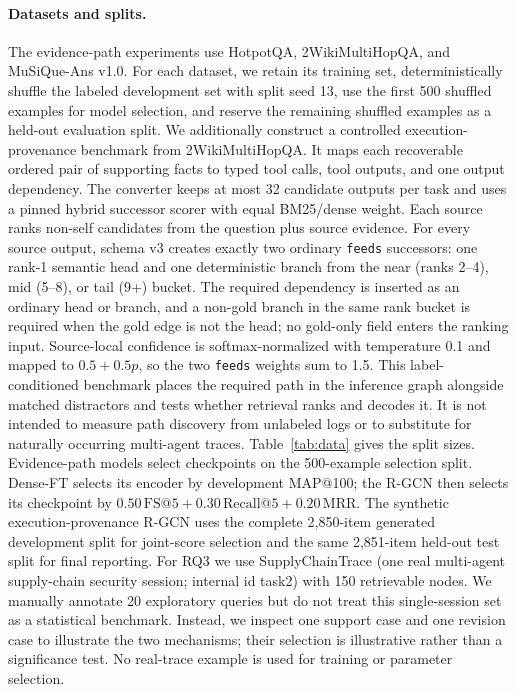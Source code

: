 \paragraph{Datasets and splits.}
The evidence-path experiments use HotpotQA, 2WikiMultiHopQA, and
MuSiQue-Ans v1.0. For each dataset, we retain its training set,
deterministically shuffle the labeled development set with split seed 13,
use the first 500 shuffled examples for model selection, and reserve the
remaining shuffled examples as a held-out evaluation split. We additionally
construct a controlled execution-provenance benchmark from
2WikiMultiHopQA. It maps each recoverable ordered pair of supporting facts
to typed tool calls, tool outputs, and one output dependency. The converter keeps at most 32 candidate outputs per task and uses a pinned
hybrid successor scorer with equal BM25/dense weight. Each source ranks
non-self candidates from the question plus source evidence. For every
source output, schema v3 creates exactly two ordinary \texttt{feeds}
successors: one rank-1 semantic head and one deterministic branch from the
near (ranks 2--4), mid (5--8), or tail (9+) bucket. The required dependency
is inserted as an ordinary head or branch, and a non-gold branch in the
same rank bucket is required when the gold edge is not the head; no
gold-only field enters the ranking input. Source-local confidence is
softmax-normalized with temperature 0.1 and mapped to $0.5+0.5p$, so the
two \texttt{feeds} weights sum to 1.5. This
label-conditioned benchmark places the required path in the inference graph
alongside matched distractors and tests whether retrieval ranks and decodes
it. It is not intended to measure path discovery from unlabeled logs or to
substitute for naturally occurring multi-agent traces. Table~\ref{tab:data} gives the split sizes.
Evidence-path models select checkpoints on the 500-example selection
split. Dense-FT selects its encoder by development MAP@100; the R-GCN then
selects its checkpoint by
$0.50\,\mathrm{FS@5}+0.30\,\mathrm{Recall@5}+0.20\,\mathrm{MRR}$. The synthetic
execution-provenance R-GCN uses the complete 2,850-item generated
development split for joint-score selection and the same 2,851-item
held-out test split for final reporting. For RQ3 we use SupplyChainTrace (one real multi-agent supply-chain
security session; internal id task2) with 150 retrievable nodes. We manually
annotate 20 exploratory queries but do not treat this single-session set as
a statistical benchmark. Instead, we inspect one support case and one
revision case to illustrate the two mechanisms; their selection is
illustrative rather than a significance test. No real-trace example is used
for training or parameter selection.

